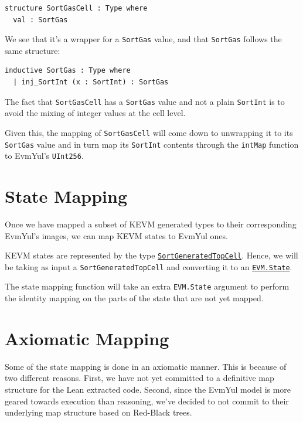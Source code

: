 \begin{verbatim}
structure SortGasCell : Type where
  val : SortGas
\end{verbatim}

We see that it's a wrapper for a \texttt{SortGas} value, and that
\texttt{SortGas} follows the same structure:

\begin{verbatim}
inductive SortGas : Type where
  | inj_SortInt (x : SortInt) : SortGas
\end{verbatim}

The fact that \texttt{SortGasCell} has a \texttt{SortGas} value and not a plain
\texttt{SortInt} is to avoid the mixing of integer values at the cell level.

Given this, the mapping of \texttt{SortGasCell} will come down to unwrapping it
to its \texttt{SortGas} value and in turn map its \texttt{SortInt} contents
through the \texttt{intMap} function to EvmYul's \texttt{UInt256}.

\section{State Mapping}

Once we have mapped a subset of KEVM generated types to their corresponding
EvmYul's images, we can map KEVM states to EvmYul ones.

\begin{definition}[stateMap]
\leanok\label{def:stateMap}

KEVM states are represented by the type
\href{https://runtimeverification.github.io/evm-equivalence/docs/EvmEquivalence/KEVM2Lean/Sorts.html#SortGeneratedTopCell}{\texttt{SortGeneratedTopCell}}.
Hence, we will be taking as input a \texttt{SortGeneratedTopCell} and converting
it to an
\href{https://runtimeverification.github.io/evm-equivalence/docs/EvmYul/EVM/State.html#EvmYul.EVM.State}{\texttt{EVM.State}}.

The state mapping function will take an extra \texttt{EVM.State} argument to
perform the identity mapping on the parts of the state that are not yet mapped.
\end{definition}

\section{Axiomatic Mapping}

Some of the state mapping is done in an axiomatic manner. This is because of two
different reasons. First, we have not yet committed to a definitive map structure
for the Lean extracted code. Second, since the EvmYul model is more geared
towards execution than reasoning, we've decided to not commit to their
underlying map structure based on Red-Black trees.

